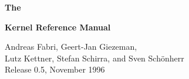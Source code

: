 \vspace*{0.5cm}
\thispagestyle{empty}
\centerline{{\Huge\bf The}}
\vspace{3mm}

\begin{center}
\leavevmode
\epsfysize=2cm
\epsfysize=2cm
\epsfysize=2.1cm
\epsfysize=2cm
\end{center}

\centerline{{\Huge\bf Kernel Reference Manual}
}
\vspace{3mm}

\begin{center}
Andreas Fabri, Geert-Jan Giezeman,\\
Lutz Kettner, Stefan Schirra, and Sven Sch\"onherr\\[2cm]
{\small Release 0.5, November 1996}
\end{center}
\vspace*{0.5cm}

\begin{center}
\leavevmode
\epsfxsize=12cm
\end{center}


\setcounter{page}{0}
\cleardoublepage
\tableofcontents
